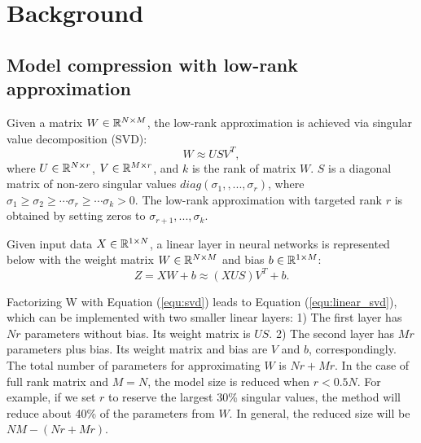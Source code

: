 \section{Background}

\subsection{Model compression with low-rank approximation}

Given a matrix $W \in \mathbb{R}^{N \times M}$, the low-rank approximation is achieved via singular value decomposition (SVD):
\begin{equation}
    W \approx US{V^T},
\label{equ:svd}
\end{equation}
where $U \in \mathbb{R}^{N \times r}$, $V \in \mathbb{R}^{M \times r}$, and $k$ is the rank of matrix $W$. $S$ is a diagonal matrix of non-zero singular values $diag(\sigma_1, ,...,\sigma_r)$, where ${\sigma _1} \ge {\sigma _2} \ge  \cdots {\sigma _r} \ge  \cdots {\sigma _k} > 0$. The low-rank approximation with targeted rank $r$ is obtained by setting zeros to  $\sigma_{r+1},...,\sigma_k$.

Given input data $X \in \mathbb{R}^{1 \times N}$, a linear layer in neural networks is represented below with the weight matrix $W \in \mathbb{R}^{N \times M}$ and bias $b \in \mathbb{R}^{1 \times M}$:
\begin{equation}
Z = XW + b  \approx (XUS){V^T} + b.
\label{equ:linear_svd}
\end{equation}

Factorizing W with Equation (\ref{equ:svd}) leads to Equation (\ref{equ:linear_svd}), which can be implemented with two smaller linear layers: 1) The first layer has $Nr$ parameters without bias. Its weight matrix is $US$. 2) The second layer has $Mr$ parameters plus bias. Its weight matrix and bias are $V$ and $b$, correspondingly. 
The total number of parameters for approximating $W$ is $Nr+Mr$. In the case of full rank matrix and $M=N$, the model size is reduced when $r<0.5N$. For example, if we set $r$ to reserve the largest 30\% singular values, the method will reduce about 40\% of the parameters from $W$. In general, the reduced size will be $NM-(Nr+Mr)$.

